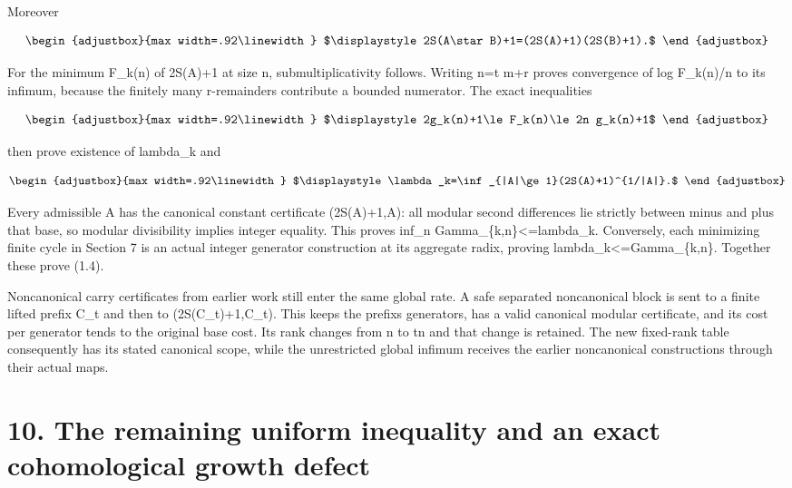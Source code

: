 Moreover

\[
\begin{adjustbox}{max width=.92\linewidth}
$\displaystyle 2S(A\star B)+1=(2S(A)+1)(2S(B)+1).$
\end{adjustbox}
\]

For the minimum F\_k(n) of 2S(A)+1 at size n, submultiplicativity follows. Writing n=t m+r proves convergence of log F\_k(n)/n to its infimum, because the finitely many r-remainders contribute a bounded numerator. The exact inequalities

\[
\begin{adjustbox}{max width=.92\linewidth}
$\displaystyle 2g_k(n)+1\le F_k(n)\le2n g_k(n)+1$
\end{adjustbox}
\]

then prove existence of lambda\_k and

\[
\begin{adjustbox}{max width=.92\linewidth}
$\displaystyle \lambda_k=\inf_{|A|\ge1}(2S(A)+1)^{1/|A|}.$
\end{adjustbox}
\]

Every admissible A has the canonical constant certificate (2S(A)+1,A): all modular second differences lie strictly between minus and plus that base, so modular divisibility implies integer equality. This proves inf\_n Gamma\_\{k,n\}\textless=lambda\_k. Conversely, each minimizing finite cycle in Section 7 is an actual integer generator construction at its aggregate radix, proving lambda\_k\textless=Gamma\_\{k,n\}. Together these prove (1.4).

Noncanonical carry certificates from earlier work still enter the same global rate. A safe separated noncanonical block is sent to a finite lifted prefix C\_t and then to (2S(C\_t)+1,C\_t). This keeps the prefix\textquotesingle s generators, has a valid canonical modular certificate, and its cost per generator tends to the original base cost. Its rank changes from n to tn and that change is retained. The new fixed-rank table consequently has its stated canonical scope, while the unrestricted global infimum receives the earlier noncanonical constructions through their actual maps.

\section{10. The remaining uniform inequality and an exact cohomological growth defect}\label{n04-the-remaining-uniform-inequality-and-an-exact-cohomological-growth-defect}


